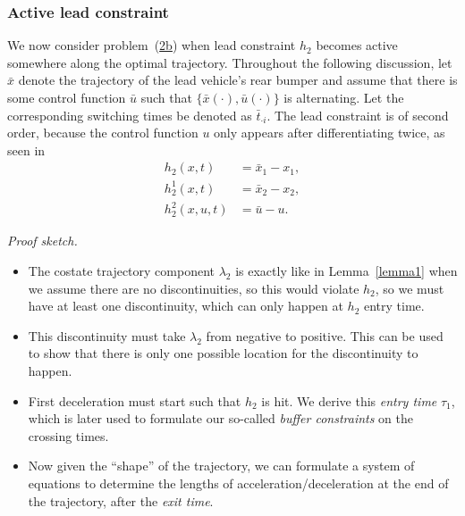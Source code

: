 \documentclass[a4paper]{article}
\theoremstyle{definition}
\theoremstyle{plain}
\begin{document}
\newpage
\subsubsection{Active lead constraint}

We now consider problem~(\hyperref[eq:setting]{2b}) when lead constraint $h_{2}$
becomes active somewhere along the optimal trajectory. Throughout the following
discussion, let $\bar{x}$ denote the trajectory of the lead vehicle's rear
bumper and assume that there is some control function $\bar{u}$ such that
$\{\bar{x}(\cdot), \bar{u}(\cdot)\}$ is alternating. Let the corresponding switching times
be denoted as $\bar{t}_{\cdot i}$.
%
The lead constraint is of second order, because the control function $u$ only
appears after differentiating twice, as seen in
\begin{align*}
  h_{2}(x, t) &= \bar{x}_{1} - x_{1}, \\
  h_{2}^{1}(x, t) &= \bar{x}_{2} - x_{2}, \\
  h_{2}^{2}(x, u, t) &= \bar{u} - u .
\end{align*}

\vspace{0.5em}
\noindent
\textit{Proof sketch.}
\begin{itemize}
  \item The costate trajectory component $\lambda_{2}$ is exactly like in
        Lemma~\ref{lemma1} when we assume there are no discontinuities, so this
        would violate $h_{2}$, so we must have at least one discontinuity, which
        can only happen at $h_{2}$ entry time.
  \item This discontinuity must take $\lambda_{2}$ from negative to positive.
        This can be used to show that there is only one possible location for
        the discontinuity to happen.
  \item First deceleration must start such that $h_{2}$ is hit. We derive this
        \emph{entry time} $\tau_{1}$, which is later used to formulate our
        so-called \emph{buffer constraints} on the crossing times.
  \item Now given the ``shape'' of the trajectory, we can formulate a system of
        equations to determine the lengths of acceleration/deceleration at the
        end of the trajectory, after the \emph{exit time}.
\end{itemize}
\end{document}
